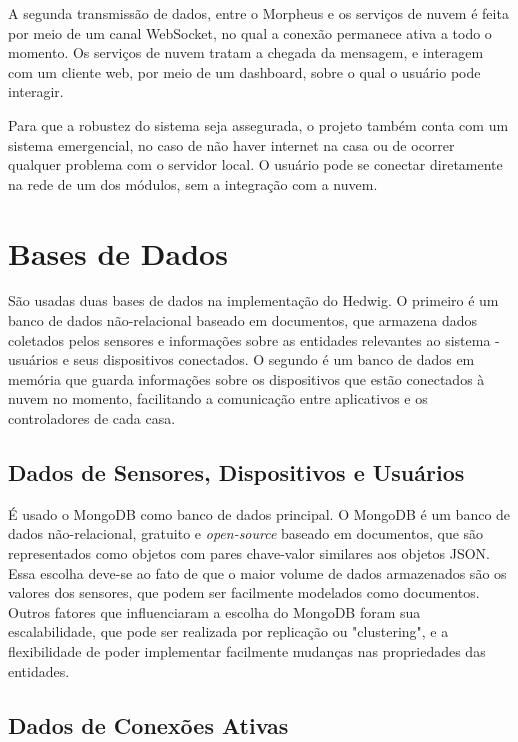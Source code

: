 A segunda transmissão de dados, entre o Morpheus e os serviços de nuvem é feita por meio de um canal WebSocket, no qual a conexão permanece ativa a todo o momento. Os serviços de nuvem tratam a chegada da mensagem, e interagem com um cliente web, por meio de um dashboard, sobre o qual o usuário pode interagir.


Para que a robustez do sistema seja assegurada, o projeto também conta com um sistema emergencial, no caso de não haver internet na casa ou de ocorrer qualquer problema com o servidor local. O usuário pode se conectar diretamente na rede de um dos módulos, sem a integração com a nuvem.

\section{Bases de Dados}

São usadas duas bases de dados na implementação do Hedwig. O primeiro é um banco de dados não-relacional baseado em documentos, que armazena dados coletados pelos sensores e informações sobre as entidades relevantes ao sistema - usuários e seus dispositivos conectados. O segundo é um banco de dados em memória que guarda informações sobre os dispositivos que estão conectados à nuvem no momento, facilitando a comunicação entre aplicativos e os controladores de cada casa.


\subsection{Dados de Sensores, Dispositivos e Usuários}

É usado o MongoDB como banco de dados principal. O MongoDB é um banco de dados não-relacional, gratuito e \emph{open-source} baseado em documentos, que são representados como objetos com pares chave-valor similares aos objetos JSON. Essa escolha deve-se ao fato de que o maior volume de dados armazenados são os valores dos sensores, que podem ser facilmente modelados como documentos. Outros fatores que influenciaram a escolha do MongoDB foram sua escalabilidade, que pode ser realizada por replicação ou "clustering", e a flexibilidade de poder implementar facilmente mudanças nas propriedades das entidades.

\subsection{Dados de Conexões Ativas}

